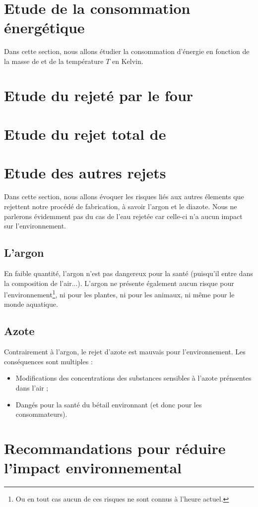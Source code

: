 
\section{Etude de  la consommation énergétique}
Dans cette section, nous allons étudier la 
consommation d'énergie en fonction de la
masse de  et de la température $T$
en Kelvin.
\section{Etude du  rejeté par le four}
\section{Etude du rejet total de }
\section{Etude des autres rejets}
Dans cette section, nous allons
évoquer les risques liés aux autres 
élements que rejettent notre procédé
de fabrication, à savoir l'argon et
le diazote. Nous ne parlerons
évidemment pas du cas de l'eau 
rejetée car celle-ci n'a aucun impact
sur l'environnement.
\subsection{L'argon}
En faible quantité, l'argon n'est
pas dangereux pour la santé (puisqu'il
entre dans la composition de l'air...).
L'argon ne présente également aucun risque
pour l'environnement\footnote{Ou en tout
cas aucun de ces risques ne sont connus
à l'heure actuel.}, ni pour les plantes, 
ni pour les animaux, ni même pour le monde
aquatique.
\subsection{Azote}
Contrairement à l'argon, le rejet 
d'azote est mauvais pour l'environnement.
Les conséquences sont multiples :
\begin{itemize}
	\item Modifications des concentrations
	des substances sensibles à l'azote
	prénsentes dans l'air ;
	\item Dangés pour la santé du bétail
	environnant (et donc pour les consommateurs).
\end{itemize}

\section{Recommandations pour réduire
l'impact environnemental}
